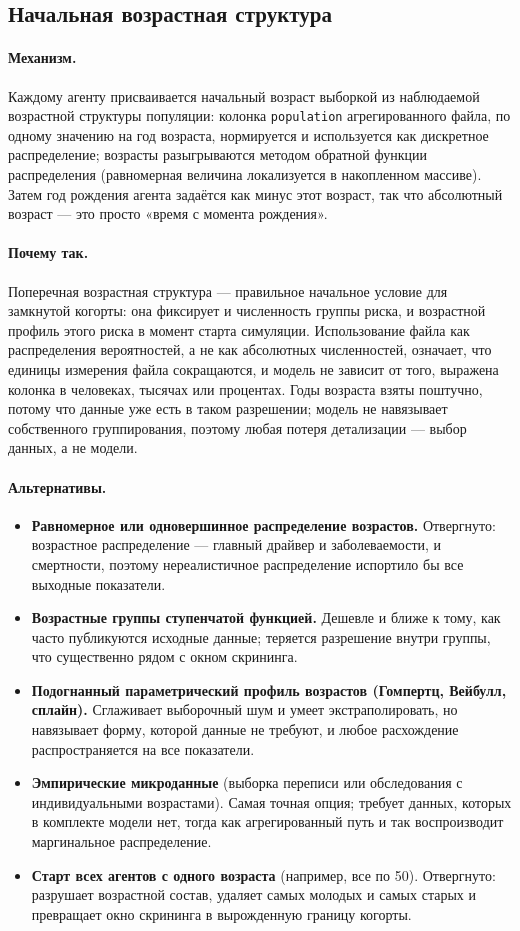 \documentclass[12pt,a4paper]{article}
\newcommand{\id}[1]{\texttt{#1}}
\newcommand{\mech}[1]{\paragraph{Механизм.} #1}
\newcommand{\why}[1]{\paragraph{Почему так.} #1}
\newcommand{\alt}[1]{\paragraph{Альтернативы.} #1}
\begin{document}
\subsection{Начальная возрастная структура}

\mech{Каждому агенту присваивается начальный возраст выборкой из наблюдаемой возрастной структуры
популяции: колонка \id{population} агрегированного файла, по одному значению на год возраста, нормируется
и используется как дискретное распределение; возрасты разыгрываются методом обратной функции распределения
(равномерная величина локализуется в накопленном массиве). Затем год рождения агента задаётся как минус
этот возраст, так что абсолютный возраст --- это просто «время с момента рождения».}

\why{Поперечная возрастная структура --- правильное начальное условие для замкнутой когорты: она
фиксирует и численность группы риска, и возрастной профиль этого риска в момент старта симуляции.
Использование файла как распределения вероятностей, а не как абсолютных численностей, означает, что
единицы измерения файла сокращаются, и модель не зависит от того, выражена колонка в человеках, тысячах
или процентах. Годы возраста взяты поштучно, потому что данные уже есть в таком разрешении; модель не
навязывает собственного группирования, поэтому любая потеря детализации --- выбор данных, а не модели.}

\alt{\begin{itemize}[nosep]
  \item \textbf{Равномерное или одновершинное распределение возрастов.} Отвергнуто: возрастное
        распределение --- главный драйвер и заболеваемости, и смертности, поэтому нереалистичное
        распределение испортило бы все выходные показатели.
  \item \textbf{Возрастные группы ступенчатой функцией.} Дешевле и ближе к тому, как часто публикуются
        исходные данные; теряется разрешение внутри группы, что существенно рядом с окном скрининга.
  \item \textbf{Подогнанный параметрический профиль возрастов (Гомпертц, Вейбулл, сплайн).} Сглаживает
        выборочный шум и умеет экстраполировать, но навязывает форму, которой данные не требуют, и любое
        расхождение распространяется на все показатели.
  \item \textbf{Эмпирические микроданные} (выборка переписи или обследования с индивидуальными возрастами).
        Самая точная опция; требует данных, которых в комплекте модели нет, тогда как агрегированный путь и
        так воспроизводит маргинальное распределение.
  \item \textbf{Старт всех агентов с одного возраста} (например, все по 50). Отвергнуто: разрушает
        возрастной состав, удаляет самых молодых и самых старых и превращает окно скрининга в вырожденную
        границу когорты.
\end{itemize}}
\end{document}

